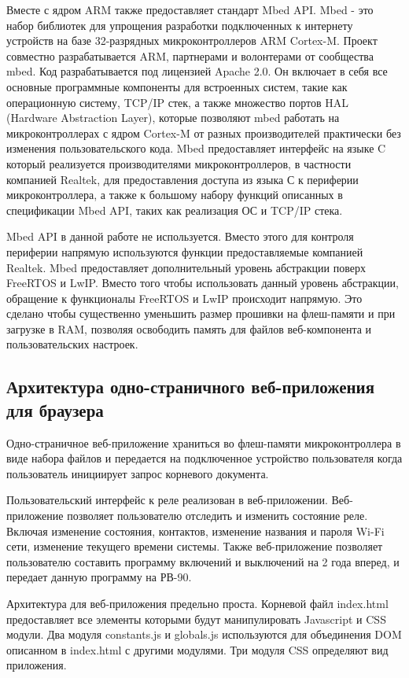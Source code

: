 Вместе с ядром ARM также предоставляет стандарт Mbed API.
Mbed - это набор библиотек для упрощения разработки подключенных к интернету устройств на базе 32-разрядных микроконтроллеров ARM Cortex-M. Проект совместно разрабатывается ARM, партнерами и волонтерами от сообщества mbed. Код разрабатывается под лицензией Apache 2.0. Он включает в себя все основные программные компоненты для встроенных систем, такие как операционную систему, TCP/IP стек, а также множество портов HAL (Hardware Abstraction Layer), которые позволяют mbed работать на микроконтроллерах с ядром Cortex-M от разных производителей практически без изменения пользовательского кода.
Mbed предоставляет интерфейс на языке C который реализуется производителями микроконтроллеров, в частности компанией Realtek, для предоставления доступа из языка С к периферии микроконтроллера, а также к большому набору функций описанных в спецификации Mbed API, таких как реализация ОС и TCP/IP стека. 

Mbed API в данной работе не используется. Вместо этого для контроля периферии напрямую используются функции предоставляемые компанией Realtek. Mbed предоставляет дополнительный уровень абстракции поверх FreeRTOS и LwIP. Вместо того чтобы использовать данный уровень абстракции, обращение к функционалы FreeRTOS и LwIP происходит напрямую. Это сделано чтобы существенно уменьшить размер прошивки на флеш-памяти и при загрузке в RAM, позволяя освободить память для файлов веб-компонента и пользовательских настроек. 


\newpage
\subsection{Архитектура одно-страничного веб-приложения для браузера}
Одно-страничное веб-приложение храниться во флеш-памяти микроконтроллера в виде набора файлов и передается на подключенное устройство пользователя когда пользователь инициирует запрос корневого документа.

Пользовательский интерфейс к реле реализован в веб-приложении. Веб-приложение позволяет пользователю отследить и изменить состояние реле. Включая изменение состояния, контактов, изменение названия и пароля Wi-Fi сети, изменение текущего времени системы. Также веб-приложение позволяет пользователю составить программу включений и выключений на 2 года вперед, и передает данную программу на РВ-90.

Архитектура для веб-приложения предельно проста. Корневой файл index.html предоставляет все элементы которыми будут манипулировать Javascript и CSS модули. Два модуля constants.js и globals.js используются для объединения DOM описанном в index.html с другими модулями. Три модуля CSS определяют вид приложения.

